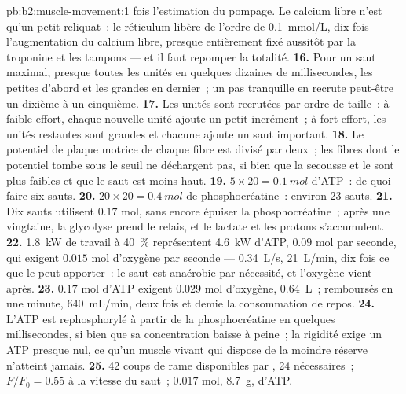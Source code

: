 \begin{solution}{pb:b2:muscle-movement:1}
fois l'estimation du pompage. Le calcium libre n'est qu'un petit reliquat~:
le réticulum libère de l'ordre de \qty{0.1}{mmol/L}, dix fois
l'augmentation du calcium libre, presque entièrement fixé aussitôt par la
troponine et les tampons --- et il faut repomper la totalité.
\textbf{16.} Pour un saut maximal, presque toutes les unités en quelques
dizaines de millisecondes, les petites d'abord et les grandes en
dernier~; un pas tranquille en recrute peut-être un dixième à un cinquième.
\textbf{17.} Les unités sont recrutées par ordre de taille~: à faible
effort, chaque nouvelle unité ajoute un petit incrément~; à fort effort,
les unités restantes sont grandes et chacune ajoute un saut important.
\textbf{18.} Le potentiel de plaque motrice de chaque fibre est divisé
par deux~; les fibres dont le potentiel tombe sous le seuil ne déchargent
pas, si bien que la secousse et le  sont plus faibles et que le
saut est moins haut.
\textbf{19.} $5\times 20 = \qty{0.1}{mol}$ d'ATP~: de quoi faire six sauts.
\textbf{20.} $20\times 20 = \qty{0.4}{mol}$ de phosphocréatine~:
environ 23 sauts.
\textbf{21.} Dix sauts utilisent $0.17$ mol, sans encore épuiser la
phosphocréatine~; après une vingtaine, la glycolyse prend le relais, et
le lactate et les protons s'accumulent.
\textbf{22.} \qty{1.8}{kW} de travail à \qty{40}{\%} représentent
\qty{4.6}{kW} d'ATP, $0.09$ mol par seconde, qui exigent $0.015$ mol
d'oxygène par seconde ---
\qty{0.34}{L/s}, \qty{21}{L/min}, dix fois ce que le  peut apporter~:
le saut est anaérobie par nécessité, et l'oxygène vient après.
\textbf{23.} $0.17$ mol d'ATP exigent $0.029$ mol d'oxygène,
\qty{0.64}{L}~; remboursés en une minute, \qty{640}{mL/min}, deux fois et
demie la consommation de repos.
\textbf{24.} L'ATP est rephosphorylé à partir de la phosphocréatine en
quelques millisecondes, si bien que sa concentration baisse à peine~; la
rigidité exige un ATP presque nul, ce qu'un muscle vivant qui dispose de
la moindre réserve n'atteint jamais.
\textbf{25.} 42 coups de rame disponibles par , 24
nécessaires~; $F/F_0 = 0.55$ à la vitesse du saut~; $0.017$ mol,
\qty{8.7}{g}, d'ATP.
\end{solution}
